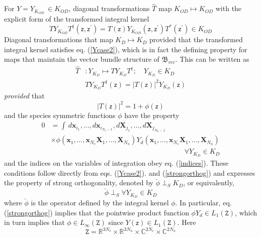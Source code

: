\documentclass[aps,preprint]{revtex4}%
\begin{document}
For $Y=Y_{K_{OD}}\,\in K_{OD}$, diagonal transformations $\hat{T}$ map
$K_{OD}\mapsto K_{OD}$ with the explicit form of the transformed integral
kernel
\begin{equation}
TY_{K_{OD}}T^{\dagger}(\mathsf{z},\mathsf{z}^{\prime})=T(\mathsf{z})Y_{K_{OD}%
}(\mathsf{z},\mathsf{z}^{\prime})T^{\ast}(\mathsf{z}^{\prime})\in K_{OD}
\label{TYodTkernel}%
\end{equation}
Diagonal transformations that map $K_{D}\mapsto K_{D}$ provided that the
transformed integral kernel satisfies eq. (\ref{Ycase2}), which is in fact the
defining property for maps that maintain the vector bundle structure of
$\mathfrak{B}_{vec}$. This can be written as
\begin{align}
\hat{T}  &  :Y_{K_{D}}\mapsto TY_{K_{D}}T^{\dagger};\quad Y_{K_{D}}\in
K_{D}\nonumber\\
&  TY_{K_{D}}T^{\dagger}(\mathsf{z})=|T(\mathsf{z})|^{2}Y_{K_{D}}(\mathsf{z})
\end{align}
\emph{provided} that
\begin{equation}
|T(\mathsf{z})|^{2}=1+\phi(\mathsf{z}) \label{phidef}%
\end{equation}
and the species symmetric functions $\phi$ have the property
\begin{align}
0  &  =\int\,d\mathbf{x}_{i_{1}},\ldots,d\mathbf{x}_{i_{N_{e}-1}}%
,d\mathbf{X}_{j_{1}},\ldots,d\mathbf{X}_{j_{N_{n}-1}}\nonumber\\
&  \times\phi(\mathbf{x}_{1},\ldots,\mathbf{x}_{N_{e}}\mathbf{X}_{1}%
,\ldots,\mathbf{X}_{N_{n}})Y_{d}(\mathbf{x}_{1},\ldots,\mathbf{x}_{N_{e}%
}\mathbf{X}_{1},\ldots,\mathbf{X}_{N_{n}})\nonumber\\
&  \qquad\qquad\qquad\qquad\qquad\qquad\qquad\qquad\qquad\quad\forall
Y_{K_{D}}\in K_{D} \label{strongorthog}%
\end{align}
and the indices on the variables of integration obey eq. (\ref{indices}).
These conditions follow directly from eqs. (\ref{Ycase2}). and
(\ref{strongorthog}) and expresses the property of strong orthogonality,
denoted by $\breve{\phi}\perp_{S}K_{D}$, or equivalently,
\begin{equation}
\breve{\phi}\perp_{S}\forall Y_{K_{D}}\in K_{D}%
\end{equation}
where $\breve{\phi}$ is the operator defined by the integral kernel $\phi$. In
particular, eq. (\ref{strongorthog}) implies that the pointwise product
function $\phi Y_{d}\in L_{1}(\mathtt{Z})$, which in turn implies that
$\phi\in L_{\infty}(\mathtt{Z})$ since $Y(\mathsf{z})\in L_{1}(\mathtt{Z})$.
Here
\begin{equation}
\mathtt{Z}=\mathbb{R}^{3N_{e}}\times\mathbb{R}^{3N_{n}}\times\mathbb{C}%
^{2N_{e}}\times\mathbb{C}^{2N_{n}}%
\end{equation}
\end{document}
